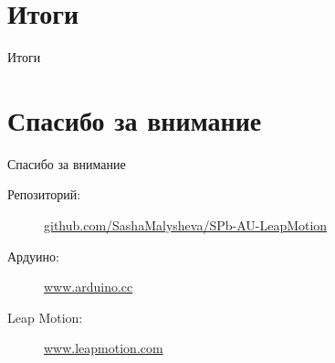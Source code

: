 \documentclass{beamer}
\newcommand{\cimg}[2]{%
	\begin{center}%
		\ifthenelse{\equal{#2}{}}{%
			\texttt{[image: \#1]}
		}{%
			\texttt{[image: \#1]}
		}%
	\end{center}%
}
\begin{document}
\section{Итоги}
\begin{frame}[t]{Итоги}
	\cimg{04.png}{0.9}
\end{frame}

\section{Спасибо за внимание}
\begin{frame}[t]{Спасибо за внимание}
	\begin{description}
		\item[Репозиторий:]  \url{github.com/SashaMalysheva/SPb-AU-LeapMotion}
		\item[Ардуино:]  \url{www.arduino.cc} 
		\item[Leap Motion:] \url{www.leapmotion.com}
	\end{description}
\end{frame}
\end{document}
